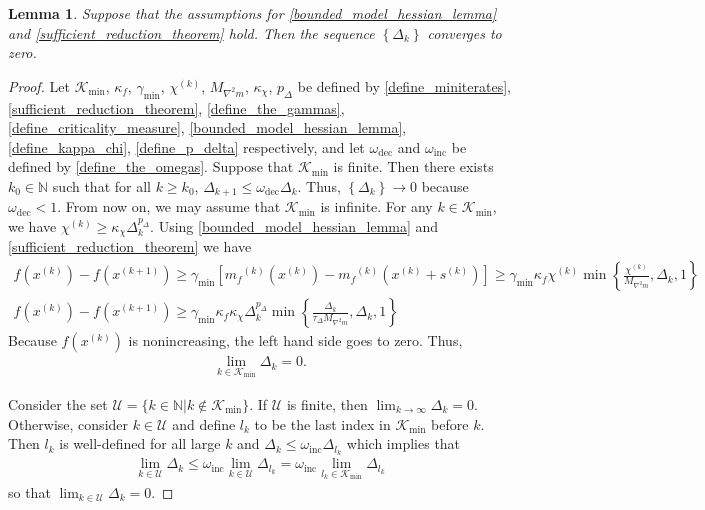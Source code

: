 \documentclass{article}
\newtheorem{lemma}[theorem]{Lemma}
\theoremstyle{case}
\numberwithin{theorem}{subsection}
\newcommand{\chik}{{\chi^{(k)}}}
\newcommand{\dk}{\Delta_k}
\newcommand{\dkpo}{\Delta_{k+1}}
\newcommand{\gammasm}{\gamma_{\textrm{min}}}
\newcommand{\maxmodelhessian}{{M_{\nabla^2 m}}}
\newcommand{\mfk}{{{m}_f}^{(k)}}
\newcommand{\naturals}{\mathbb N}
\newcommand{\oalpha}{\tau_{\Delta}}
\newcommand{\omegadec}{\omega_{\text{dec}}}
\newcommand{\omegainc}{\omega_{\text{inc}}}
\newcommand{\sk}{{{s}^{(k)}}}
\newcommand{\xkpo}{{{x}^{(k+1)}}}
\newcommand{\xk}{x^{(k)}}
\newcommand{\miniterates}{{\mathcal K_{\textrm{min}}}}
\begin{document}
\begin{lemma}
\label{delta_to_zero}
Suppose that the assumptions for
\cref{bounded_model_hessian_lemma} and
\cref{sufficient_reduction_theorem}
hold.
Then the sequence $\left\{\dk\right\}$ converges to zero.
\end{lemma}

\begin{proof}
Let
$\miniterates$, $\kappa_f$, $\gammasm$, $\chik$, $\maxmodelhessian$, $\kappa_{\chi}$, $p_{\Delta}$
be defined by
\cref{define_miniterates}, \cref{sufficient_reduction_theorem}, \cref{define_the_gammas}, \cref{define_criticality_measure}, \cref{bounded_model_hessian_lemma}, \cref{define_kappa_chi}, \cref{define_p_delta}
respectively,
and let $\omegadec$ and $\omegainc$ be defined by \cref{define_the_omegas}.
Suppose that $\miniterates$ is finite.
Then there exists $k_0 \in \naturals$ such that for all $k \ge  k_0$, $\dkpo \le \omegadec \dk$.
Thus, $\left\{\dk\right\} \to 0$ because $\omegadec < 1$.
From now on, we may assume that $\miniterates$ is infinite.  
For any $k \in \miniterates$, we have $\chik \ge \kappa_{\chi}\dk^{p_{\Delta}}$.
Using \cref{bounded_model_hessian_lemma} and \cref{sufficient_reduction_theorem} we have
\begin{align*}
f\left(\xk\right) - f\left(\xkpo\right) \ge \gammasm \left[\mfk\left(\xk\right) - \mfk\left(\xk + \sk\right)\right] \ge \gammasm \kappa_f \chik \min\left\{\frac{\chik}{\maxmodelhessian}, \dk, 1\right\} \\
f\left(\xk\right) - f\left(\xkpo\right) \ge \gammasm\kappa_f \kappa_{\chi}\dk^{p_{\Delta}}\min\left\{\frac{\dk}{\oalpha \maxmodelhessian}, \dk, 1\right\}
\end{align*}
% 
Because $f\left(\xk\right)$ is nonincreasing, the left hand side goes to zero.
Thus,
\begin{align}
\lim_{k \in \miniterates} \dk = 0.
\end{align}

Consider the set
$\mathcal U = \{ k \in \naturals | k \not \in \miniterates \}$.
If $\mathcal U$ is finite, then $\lim_{k\to\infty}\dk = 0$.
Otherwise, consider $k \in \mathcal U$ and define $l_k$ to be the last index in $\miniterates$ before $k$.
Then $l_k$ is well-defined for all large $k$  and $\dk \le \omegainc \Delta_{l_k}$ which implies that
\begin{align}
\lim_{k \in \mathcal U } \dk \le \omegainc \lim_{k \in \mathcal U} \Delta_{l_k} = \omegainc \lim_{l_k \in \miniterates} \Delta_{l_k}
\end{align}
so that $\lim_{k \in \mathcal U} \dk = 0$.
\end{proof}
\end{document}
